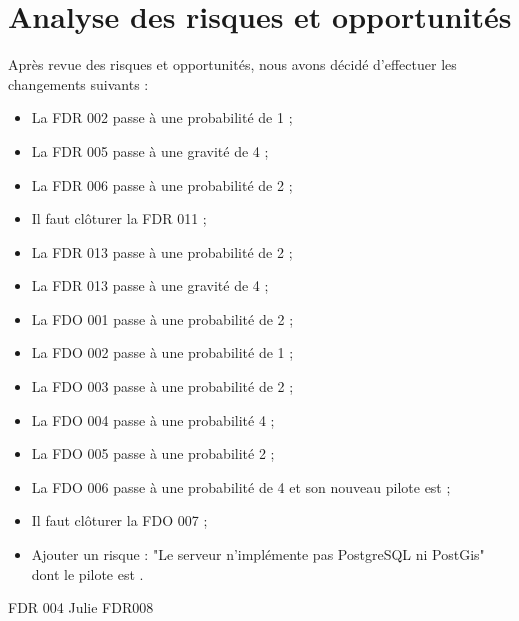 \documentclass [a4paper] {article}
\begin{document}
\section{Analyse des risques et opportunités}
Après revue des risques et opportunités, nous avons décidé d'effectuer les changements suivants :
\begin{itemize}
\item La FDR 002 passe à une probabilité de 1 ;
\item La FDR 005 passe à une gravité de 4 ;
\item La FDR 006 passe à une probabilité de 2 ;
\item Il faut clôturer la FDR 011 ;
\item La FDR 013 passe à une probabilité de 2 ;
\item La FDR 013 passe à une gravité de 4 ;
\item La FDO 001 passe à une probabilité de 2 ;
\item La FDO 002 passe à une probabilité de 1 ;
\item La FDO 003 passe à une probabilité de 2 ;
\item La FDO 004 passe à une probabilité 4 ;
\item La FDO 005 passe à une probabilité 2 ;
\item La FDO 006 passe à une probabilité de 4 et son nouveau pilote est \Michel ;
\item Il faut clôturer la FDO 007 ;


\item Ajouter un risque : "Le serveur n'implémente pas PostgreSQL ni PostGis" dont le pilote est \Sergi.
\end{itemize}

FDR 004 Julie
FDR008




\end{document}
